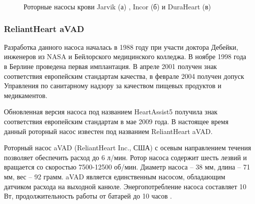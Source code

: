 \begin{figure}[ht]
\begin{minipage}[ht]{0.32\linewidth}
  \end{minipage}
  \hfill
  \begin{minipage}[ht]{0.32\linewidth}
  \end{minipage}
  \caption{Роторные насосы крови Jarvik (а) \cite{Frazier2001S125}, Incor (б) \cite{Nakashima2009199} и DuraHeart (в) \cite{Morshuis01062009}}
  \label{img:diff_pumps}  
\end{figure}

\subsubsection*{ReliantHeart aVAD}

Разработка данного насоса началась в 1988 году при участи доктора Дебейки, инженеров из NASA и Бейлорского медицинского колледжа. В ноябре 1998 года в Берлине проведена первая имплантация. В апреле 2001 получен знак соответствия европейским стандартам качества, в феврале 2004 получен допуск Управления по санитарному надзору за качеством пищевых продуктов и медикаментов.

Обновленная версия насоса под названием HeartAssist5 \cite{HeartAssistFlow} получила знак соответствия европейским стандартам в мае 2009 года. В настоящее время данный роторный насос известен под названием ReliantHeart aVAD.

Роторный насос aVAD (ReliantHeart Inc., США) с осевым направлением течения позволяет обеспечить расход до 6 л/мин. Ротор насоса содержит шесть лезвий и вращается со скоростью 7500-12500 об/мин. Диаметр насоса -- 38 мм, длина -- 71 мм, вес -- 92 грамм. aVAD является единственным насосом, обладающим датчиком расхода на выходной канюле. Энергопотребление насоса составляет 10 Вт, продолжительность работы от батарей до 10 часов \cite{Loforte2017}. 

